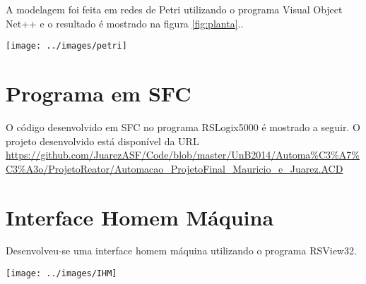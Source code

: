  A modelagem foi feita em redes de Petri utilizando o programa Visual Object Net++ e o resultado é mostrado na figura \ref{fig:planta}..
\begin{figure*}
	\centering
	\texttt{[image: ../images/petri]}
	\caption{Rede de Petri para o sistema de controle e da planta}
	\label{fig:planta}
\end{figure*}

\section{Programa em SFC}
O código desenvolvido em SFC no programa RSLogix5000 é mostrado a seguir. O projeto desenvolvido está disponível da URL
\url{https://github.com/JuarezASF/Code/blob/master/UnB2014/Automa%C3%A7%C3%A3o/ProjetoReator/Automacao_ProjetoFinal_Mauricio_e_Juarez.ACD}

\section{Interface Homem Máquina}
Desenvolveu-se uma interface homem máquina utilizando o programa RSView32.

\begin{figure*}
	\centering
	\texttt{[image: ../images/IHM]}
	\caption{Interface Homem Máquina}
	\label{fig:planta}
\end{figure*}